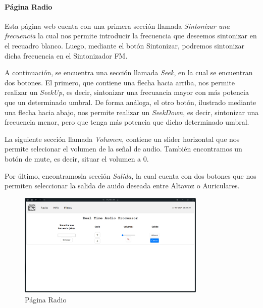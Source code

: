 \paragraph{Página Radio}
Esta página web cuenta con una primera sección llamada \textit{Sintonizar una frecuencia} la cual nos permite introducir la frecuencia que deseemos sintonizar en el recuadro blanco. Luego, mediante el botón Sintonizar, podremos sintonizar dicha frecuencia en el Sintonizador FM.

A continuación, se encuentra una sección llamada \textit{Seek}, en la cual se encuentran dos botones. El primero, que contiene una flecha hacia arriba, nos permite realizar un \textit{SeekUp}, es decir, sintonizar una frecuancia mayor con más potencia que un determinado umbral. De forma análoga, el otro botón, ilustrado mediante una flecha hacia abajo, nos permite realizar un \textit{SeekDown}, es decir, sintonizar una frecuencia menor, pero que tenga más potencia que dicho determinado umbral.

La siguiente sección llamada \textit{Volumen}, contiene un slider horizontal que nos permite selecionar el volumen de la señal de audio. También encontramos un botón de mute, es decir, situar el volumen a 0.

Por último, encontramosla sección \textit{Salida}, la cual cuenta con dos botones que nos permiten seleccionar la salida de auido deseada entre Altavoz o Auriculares.

\begin{figure}[h]
    \centering
    \includegraphics[width=0.8\textwidth]{images/3/3-1/3-1-1-2/Pagina_Radio.png}
    \caption{Página Radio}
    \label{fig:3-1-1-2-Radio}
\end{figure}